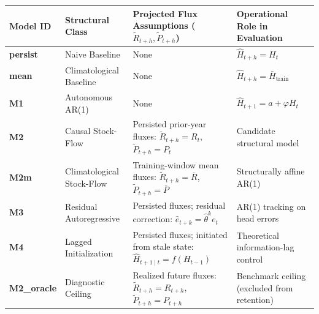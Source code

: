 \documentclass[11pt]{article}
\begin{document}
{\def\LTcaptype{none} %
\begin{longtable}[]{@{}
  >{\raggedright\arraybackslash}p{}
  >{\raggedright\arraybackslash}p{}
  >{\raggedright\arraybackslash}p{}
  >{\raggedright\arraybackslash}p{}@{}}
\toprule\noalign{}
\begin{minipage}[b]{\linewidth}\raggedright
Model ID
\end{minipage} & \begin{minipage}[b]{\linewidth}\raggedright
Structural Class
\end{minipage} & \begin{minipage}[b]{\linewidth}\raggedright
Projected Flux Assumptions (\(\tilde{R}_{t+h}, \tilde{P}_{t+h}\))
\end{minipage} & \begin{minipage}[b]{\linewidth}\raggedright
Operational Role in Evaluation
\end{minipage} \\
\midrule\noalign{}
\endhead
\bottomrule\noalign{}
\endlastfoot
\textbf{persist} & Naive Baseline & None & \(\hat{H}_{t+h} = H_t\) \\
\textbf{mean} & Climatological Baseline & None &
\(\hat{H}_{t+h} = \bar{H}_{\mathrm{train}}\) \\
\textbf{M1} & Autonomous AR(1) & None &
\(\hat{H}_{t+1} = a + \varphi H_t\) \\
\textbf{M2} & Causal Stock-Flow & Persisted prior-year fluxes:
\(\tilde{R}_{t+h} = R_t\), \(\tilde{P}_{t+h} = P_t\) & Candidate
structural model \\
\textbf{M2m} & Climatological Stock-Flow & Training-window mean fluxes:
\(\tilde{R}_{t+h} = \bar{R}\), \(\tilde{P}_{t+h} = \bar{P}\) &
Structurally affine AR(1) \\
\textbf{M3} & Residual Autoregressive & Persisted fluxes; residual
correction: \(\hat{e}_{t+k} = \hat{\theta}^k e_t\) & AR(1) tracking on
head errors \\
\textbf{M4} & Lagged Initialization & Persisted fluxes; initiated from
stale state: \(\hat{H}_{t+1 \mid t} = f(H_{t-1})\) & Theoretical
information-lag control \\
\textbf{M2\_oracle} & Diagnostic Ceiling & Realized future fluxes:
\(\tilde{R}_{t+h} = R_{t+h}\), \(\tilde{P}_{t+h} = P_{t+h}\) & Benchmark
ceiling (excluded from retention) \\
\end{longtable}
}
\end{document}
